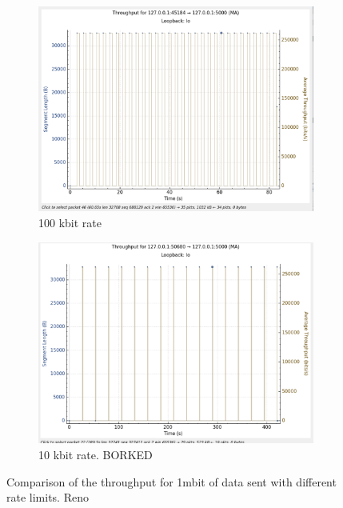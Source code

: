 \documentclass{report}
\begin{document}
\begin{figure}[H]
    \begin{subfigure}[b]{0.45\textwidth}
        \centering
        \includegraphics[width=\textwidth]{Pics/Reno/r100kbit_s1m_th}
        \caption{100 kbit rate}
    \end{subfigure}
    \hfill
    \begin{subfigure}[b]{0.45\textwidth}
        \centering
        \includegraphics[width=\textwidth]{Pics/Reno/r10kbit_s1m_th}
        \caption{10 kbit rate. BORKED}
    \end{subfigure}
    \caption{Comparison of the throughput for 1mbit of data sent with different rate limits. Reno}
    \label{fig:four_images}
\end{figure}
\end{document}
